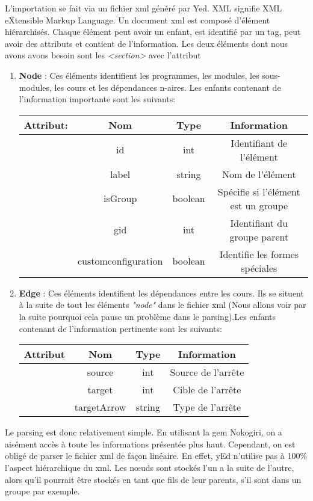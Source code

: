 L'importation se fait via un fichier xml généré par Yed. XML signifie XML eXtensible Markup Language. Un document xml est composé d'élément hiérarchisés. Chaque élément peut avoir un enfant, est identifié par un tag, peut avoir des attributs et contient de l'information. Les deux éléments dont nous avons avons besoin sont les \textit{<section>} avec l'attribut
\begin{enumerate}
\item{\textbf{Node} : Ces éléments identifient les programmes, les modules, les sous-modules, les cours et les dépendances n-aires.
Les enfants contenant de l'information importante sont les suivants:\\
\begin{tabular}{ | c || c | c || c | }
\hline
\textbf{Attribut}: & \textbf{Nom} & \textbf{Type} & \textbf{Information}\\
\hline
\hline
& id & int & Identifiant de l'élément\\
\hline
& label & string & Nom de l'élément\\
\hline
& isGroup & boolean & Spécifie si l'élément est un groupe\\
\hline
& gid & int & Identifiant du groupe parent\\
\hline
& customconfiguration & boolean & Identifie les formes spéciales\\
\hline
\end{tabular}
}
\item
{
\textbf{Edge} : Ces éléments identifient les dépendances entre les cours. Ils se situent à la suite de tout les éléments \textit{"node"} dans le fichier xml (Nous allons voir par la suite pourquoi cela pause un problème dans le parsing).Les enfants contenant de l'information pertinente sont les suivants:\\
\begin{tabular}{ | c || c | c || c| }
\hline
\textbf{Attribut} & \textbf{Nom} & \textbf{Type} & \textbf{Information}\\
\hline
\hline
& source & int & Source de l'arrête\\
\hline
& target & int & Cible de l'arrête\\
\hline
& targetArrow & string & Type de l'arrête\\
\hline
\end{tabular}
}
\end{enumerate}

Le parsing est donc relativement simple. En utilisant la gem Nokogiri, on a aisément accès à toute les informations présentée plus haut. Cependant, on est obligé de parser le fichier xml de façon linéaire. En effet, yEd n'utilise pas à 100\% l'aspect hiérarchique du xml. Les nœuds sont stockés l'un a la suite de l'autre, alors qu'il pourrait être stockés en tant que fils de leur parents, s'il sont dans un groupe par exemple.

